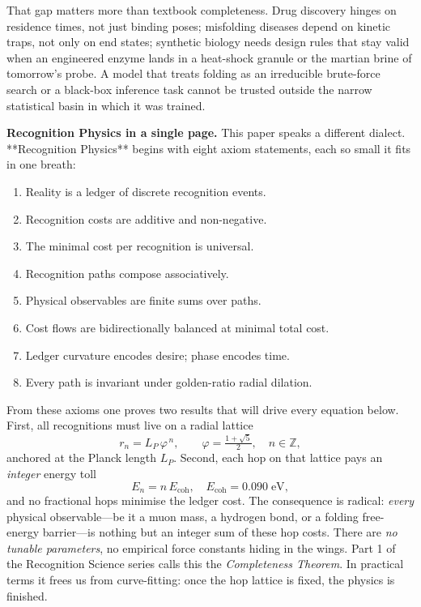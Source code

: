 \documentclass[11pt]{article}
\newcommand{\phiGR}{\varphi}                 %
\newcommand{\LP}{L_{\!P}}                    %
\newcommand{\Eoh}{E_{\mathrm{coh}}}          %
\begin{document}
That gap matters more than textbook completeness.  Drug discovery hinges
on residence times, not just binding poses; misfolding diseases depend
on kinetic traps, not only on end states; synthetic biology needs design
rules that stay valid when an engineered enzyme lands in a heat-shock
granule or the martian brine of tomorrow’s probe.  A model that treats
folding as an irreducible brute-force search or a black-box inference
task cannot be trusted outside the narrow statistical basin in which it
was trained.

\bigskip
\noindent\textbf{Recognition Physics in a single page.}
This paper speaks a different dialect.  **Recognition Physics** begins
with eight axiom statements, each so small it fits in one breath:

\begin{enumerate}
\item Reality is a ledger of discrete recognition events.
\item Recognition costs are additive and non-negative.
\item The minimal cost per recognition is universal.
\item Recognition paths compose associatively.
\item Physical observables are finite sums over paths.
\item Cost flows are bidirectionally balanced at minimal total cost.
\item Ledger curvature encodes desire; phase encodes time.
\item Every path is invariant under golden-ratio radial dilation.
\end{enumerate}

From these axioms one proves two results that will drive every equation
below.  First, all recognitions must live on a radial lattice  
\[
  r_{n} = \LP \,\phiGR^{\,n},
\qquad \phiGR=\tfrac{1+\sqrt5}{2},\quad n\in\mathbb Z,
\]
anchored at the Planck length \(\LP\).  Second, each hop on that lattice
pays an \emph{integer} energy toll  
\[
  E_{n}=n\,\Eoh,
  \quad\Eoh=0.090\;\text{eV},
\]
and no fractional hops minimise the ledger cost.  The consequence is
radical: \emph{every} physical observable—be it a muon mass, a hydrogen
bond, or a folding free-energy barrier—is nothing but an integer sum of
these hop costs.  There are \emph{no tunable parameters}, no empirical
force constants hiding in the wings.  Part 1 of the Recognition Science
series calls this the \emph{Completeness Theorem}.  In practical terms
it frees us from curve-fitting: once the hop lattice is fixed, the
physics is finished.
\end{document}

